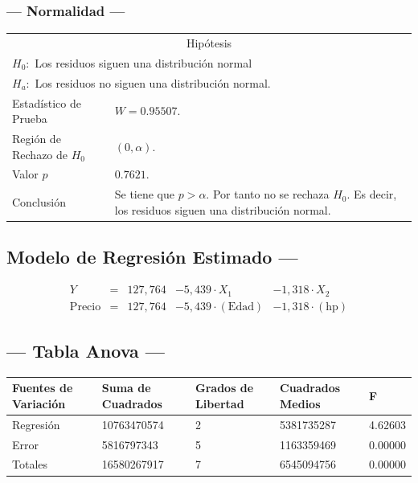 \subsubsection{--- Normalidad ---} %
\begin{center}
  \begin{tabular}{|l|p{8cm}|}
    \cline{1-2}
    \multicolumn{2}{|c|}{Hipótesis}\\ \cline{1-2}
    \multicolumn{2}{|l|}{\(H_0:\) Los residuos siguen una distribución normal} \\ 
    \multicolumn{2}{|l|}{\(H_a:\) Los residuos no siguen una distribución normal.} \\ \cline{1-2}
    Estadístico de Prueba & \(W = 0.95507\).\\ \cline{1-2} 
		Región de Rechazo de \(H_0\) & \((0, \alpha )\).\\ \cline{1-2} 
    Valor \(p\) & \(0.7621\).\\ \cline{1-2} 
    Conclusión & Se tiene que \(p> \alpha\). \newline 
		Por tanto no se rechaza \(H_0\). \newline 
		Es decir, los residuos siguen una distribución normal.\\ \cline{1-2} 
  \end{tabular}
\end{center}


\subsection{\centering Modelo de Regresión Estimado ---} %
\begin{align}
	Y & = &              127,764 & - 5,439 \cdot X_1           & - 1,318     \cdot X_2   \\[2mm]
	\mbox{Precio} & = &  127,764 & - 5,439 \cdot (\mbox{Edad}) & - 1,318     \cdot (\mbox{hp})
	\label{eq:5}
\end{align}

\subsection{\centering --- Tabla Anova ---} %
\begin{center}
  \begin{tabular}{|l|l|l|l|l|}
    \hline 
    Fuentes de Variación  & Suma de Cuadrados & Grados de Libertad & Cuadrados Medios & F\\ \hline 
Regresión  & 10763470574          &  2       & 5381735287 & 4.62603\\ \hline
Error      &  5816797343          &  5       & 1163359469 & 0.00000\\ \hline
Totales    & 16580267917          &  7       & 6545094756 & 0.00000\\ \hline
  \end{tabular}
\end{center} 

